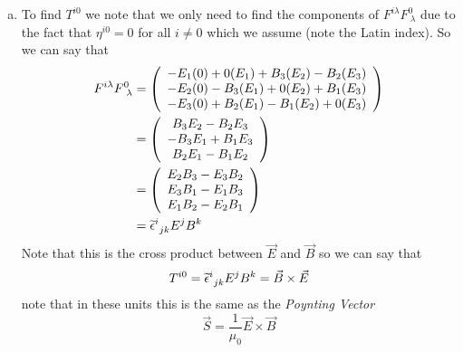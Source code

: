 \documentclass[11pt]{article}
\numberwithin{equation}{section}
\begin{document}
\begin{enumerate}[(a)]
\item
To find $T^{i0}$ we note that we only need to find the components of $F^{i\lambda}F^{0}_{\ \lambda}$ due to the fact that $\eta^{i0} = 0$ for all $i\ne0$ which we assume (note the Latin index). So we can say that
\begin{align*}
F^{i\lambda}F^{0}_{\ \lambda} &= \left(\begin{array}{c}
				-E_1(0) + 0(E_1) + B_3(E_2) - B_2(E_3)\\
				-E_2(0) - B_3(E_1) + 0(E_2) + B_1(E_3)\\
				-E_3(0) + B_2(E_1) - B_1(E_2) + 0(E_3)
				\end{array}\right)\\
&=				 \left(\begin{array}{c}
				 B_3E_2 - B_2E_3\\
				-B_3E_1 + B_1E_3\\
				 B_2E_1 - B_1E_2
				\end{array}\right)\\
&=				 \left(\begin{array}{c}
				 E_2B_3 - E_3B_2\\
				 E_3B_1 - E_1B_3\\
				 E_1B_2 - E_2B_1
				\end{array}\right)\\
&= \widetilde{\epsilon}^{i}_{\ jk}E^jB^k
\end{align*}
Note that this is the cross product between $\vec{E}$ and $\vec{B}$ so we can say that 
$$T^{i0} = \levi^{i}_{\ jk}E^{j}B^k = \vec{B}\times\vec{E}$$
note that in these units this is the same as the \emph{Poynting Vector}
$$\vec{S} = \frac{1}{\mu_0}\vec{E}\times\vec{B}$$
\end{enumerate}
\end{document}
